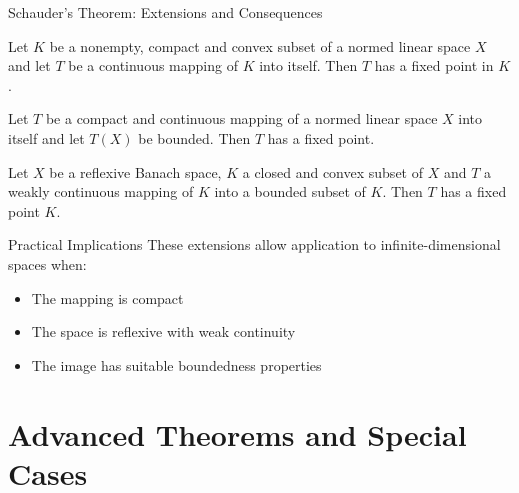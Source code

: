 \documentclass[aspectratio=169,10pt]{beamer}
\begin{document}
\begin{frame}[allowframebreaks]{Schauder's Theorem: Extensions and Consequences}
    \begin{theorem}[Theorem 5.56]
        Let $K$ be a nonempty, compact and convex subset of a normed linear space $X$ and let $T$ be a continuous mapping of $K$ into itself. Then $T$ has a fixed point in $K$.
    \end{theorem}

    \begin{theorem}[Theorem 5.57]
        Let $T$ be a compact and continuous mapping of a normed linear space $X$ into itself and let $T(X)$ be bounded. Then $T$ has a fixed point.
    \end{theorem}

    \begin{theorem}[Theorem 5.58]
        Let $X$ be a reflexive Banach space, $K$ a closed and convex subset of $X$ and $T$ a weakly continuous mapping of $K$ into a bounded subset of $K$. Then $T$ has a fixed point $K$.
    \end{theorem}

    \begin{block}{Practical Implications}
        These extensions allow application to infinite-dimensional spaces when:
        \begin{itemize}
            \item The mapping is compact
            \item The space is reflexive with weak continuity
            \item The image has suitable boundedness properties
        \end{itemize}
    \end{block}
\end{frame}

\section{Advanced Theorems and Special Cases}
\end{document}
